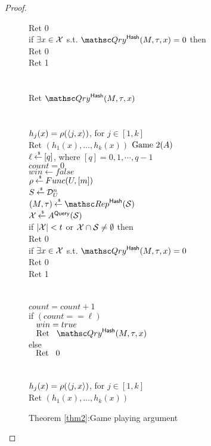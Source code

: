 \begin{proof}
\begin{figure}
{{\nudge Ret 0\\
if $\exists x \in {\cal X}$ s.t. $\Qry^{\HashOracle}(M,\tau,x)=0$ then\\
\nudge Ret 0\\
Ret 1\\\\
%
\\
Ret $\Qry^{\HashOracle}(M,\tau,x)$\\\\
%
\\
$h_j(x) = \rho(\langle j,x \rangle) $, for $j\in[1,k]$\\
Ret $\left(h_1(x),\ldots,h_k(x)\right)$
}
{
\underline{$\text{Game 2}(A)$}\\
$\ell {\:\stackrel{{\scriptscriptstyle \hspace{0.2em}\$}} {\leftarrow}\:} [q]$, where $[q] = {0,1, \cdots, q-1}$\\
$count = 0$ \\%
$win \gets false$\\
$\rho {\:\stackrel{{\scriptscriptstyle \hspace{0.2em}\$}} {\leftarrow}\:} Func(U,[m])$\\
$S {\:\stackrel{{\scriptscriptstyle \hspace{0.2em}\$}} {\leftarrow}\:} \mathcal{D}_{U}^{n}$\\
$(M,\tau) \getsr \Rep^{\HashOracle}(\calS)$\\
${\cal X} {\:\stackrel{{\scriptscriptstyle \hspace{0.2em}\$}} {\leftarrow}\:} A^{\mathsf{Query}}({\cal S})$\\
if $|{\cal X}| < t$ or ${\cal X} \cap {\cal S} \neq \emptyset$ then \\
\nudge Ret 0\\
if $\exists x \in {\cal X}$ s.t. $\Qry^{\HashOracle}(M,\tau,x)=0$\\
\nudge Ret 0\\
Ret 1\\\\
%
\\
$count=count +1$\\
if $(count == \ell)$\\
$\hspace*{2ex} win = true$\\
$\nudge \mathrm{Ret} \nudge \Qry^{\HashOracle}(M,\tau,x)$\\
else \\
$\hspace*{2ex} \mathrm{Ret}\hspace*{2ex} 0$\\\\
%
\\
$h_j(x) = \rho(\langle j,x \rangle)$, for $j\in[1,k]$\\
Ret $\left(h_1(x),\ldots,h_k(x)\right)$
}
}
\caption{Theorem \ref{thm2}:Game playing argument}\label{fig:GameT2}
\end{figure}


\end{proof}
